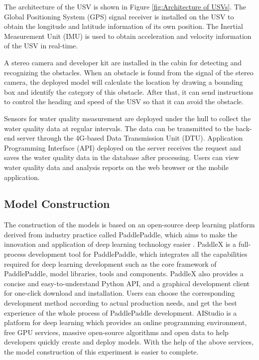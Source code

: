 \documentclass[sensors,article,submit,moreauthors,pdftex]{Definitions/mdpi}
\begin{document}
The architecture of the USV is shown in Figure \ref{fig:Architecture of USVs}. The Global Positioning System (GPS) signal receiver is installed on the USV to obtain the longitude and latitude information of its own position. The Inertial Measurement Unit (IMU) is used to obtain acceleration and velocity information of the USV in real-time.

A stereo camera and developer kit are installed in the cabin for detecting and recognizing the obstacles. When an obstacle is found from the signal of the stereo camera, the deployed model will calculate the location by drawing a bounding box and identify the category of this obstacle. After that, it can send instructions to control the heading and speed of the USV so that it can avoid the obstacle.

Sensors for water quality measurement are deployed under the hull to collect the water quality data at regular intervals. The data can be transmitted to the back-end server through the 4G-based Data Transmission Unit (DTU). Application Programming Interface (API) deployed on the server receives the request and saves the water quality data in the database after processing. Users can view water quality data and analysis reports on the web browser or the mobile application.



\subsection{Model Construction}

The construction of the models is based on an open-source deep learning platform derived from industry practice called PaddlePaddle, which aims to make the innovation and application of deep learning technology easier \cite{ma2019paddlepaddle}.
PaddleX is a full-process development tool for PaddlePaddle, which integrates all the capabilities required for deep learning development such as the core framework of PaddlePaddle, model libraries, tools and components. PaddleX also provides a concise and easy-to-understand Python API, and a graphical development client for one-click download and installation. Users can choose the corresponding development method according to actual production needs, and get the best experience of the whole process of PaddlePaddle development. AIStudio is a platform for deep learning which provides an online programming environment, free GPU services, massive open-source algorithms and open data to help developers quickly create and deploy models. 
With the help of the above services, the model construction of this experiment is easier to complete.
\end{document}
